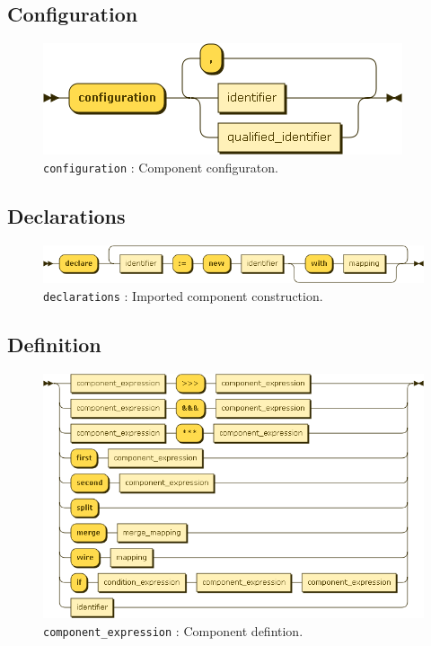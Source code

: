 \subsection{Configuration}
\begin{figure}[!h]
  \centering
    \includegraphics[scale=\DiagramScale]{chapters/compiler/diagrams/configuration}
  \caption{\texttt{configuration} : Component configuraton.}
  \label{fig:pcl-config}
\end{figure}

\subsection{Declarations}
\begin{figure}[!h]
  \centering
    \includegraphics[scale=\DiagramScale]{chapters/compiler/diagrams/declarations}
  \caption{\texttt{declarations} : Imported component construction.}
  \label{fig:pcl-decls}
\end{figure}

\subsection{Definition}
\begin{figure}[!h]
  \centering
    \includegraphics[scale=\DiagramScale,angle=90]{chapters/compiler/diagrams/component_expression}
  \caption{\texttt{component\_expression} : Component defintion.}
  \label{fig:pcl-def}
\end{figure}

